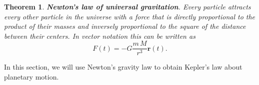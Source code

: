 \documentclass{amsart}
\newtheorem{thm}{Theorem}
\begin{document}
\begin{thm}
\textbf{Newton's law of universal gravitation}. Every particle attracts every other particle in the universe with a force that is directly proportional to the product of their masses and inversely proportional to the square of the distance between their centers. In vector notation this can be written as \[ F(t) = -G \frac{m \, M}{r^3} \mathbf{r}(t). \]
\end{thm}

In this section, we will use Newton's gravity law to obtain Kepler's law about planetary motion.
\end{document}
